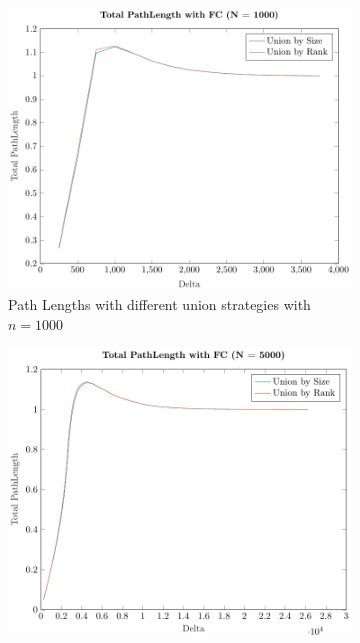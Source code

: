 \begin{figure}[ht]
    \centering
    \begin{subfigure}{0.32\textwidth}
        \centering
        \includegraphics[width=\textwidth]{../images/plotFCNonFull1000_PathLength.pdf}
        \caption{Path Lengths with different union strategies with $n = 1000$}
    \end{subfigure}%
    \hfill
    \begin{subfigure}{0.32\textwidth}
        \centering
        \includegraphics[width=\textwidth]{../images/plotFCNonFull5000_PathLength.pdf}

\end{subfigure}
\end{figure}
